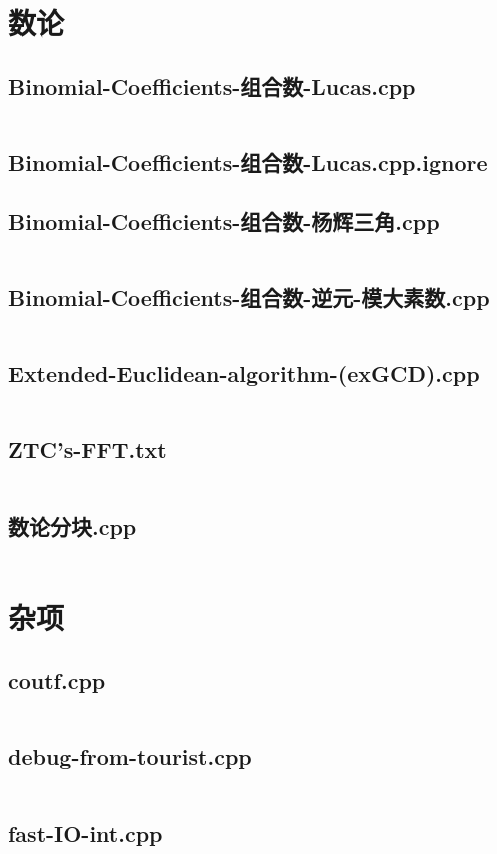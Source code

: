 \documentclass[a4paper,landscape,twocolumn]{article} %
\begin{document}
\section{数论}
\subsection{Binomial-Coefficients-组合数-Lucas.cpp}
\inputminted{c++}{./codes/029}
\subsection{Binomial-Coefficients-组合数-Lucas.cpp.ignore}
\subsection{Binomial-Coefficients-组合数-杨辉三角.cpp}
\inputminted{c++}{./codes/031}
\subsection{Binomial-Coefficients-组合数-逆元-模大素数.cpp}
\inputminted{c++}{./codes/032}
\subsection{Extended-Euclidean-algorithm-(exGCD).cpp}
\inputminted{c++}{./codes/033}
\subsection{ZTC's-FFT.txt}
\inputminted{text}{./codes/034}
\subsection{数论分块.cpp}
\inputminted{c++}{./codes/035}
\section{杂项}
\subsection{coutf.cpp}
\inputminted{c++}{./codes/036}
\subsection{debug-from-tourist.cpp}
\inputminted{c++}{./codes/037}
\subsection{fast-IO-int.cpp}
\inputminted{c++}{./codes/038}
\end{document}
